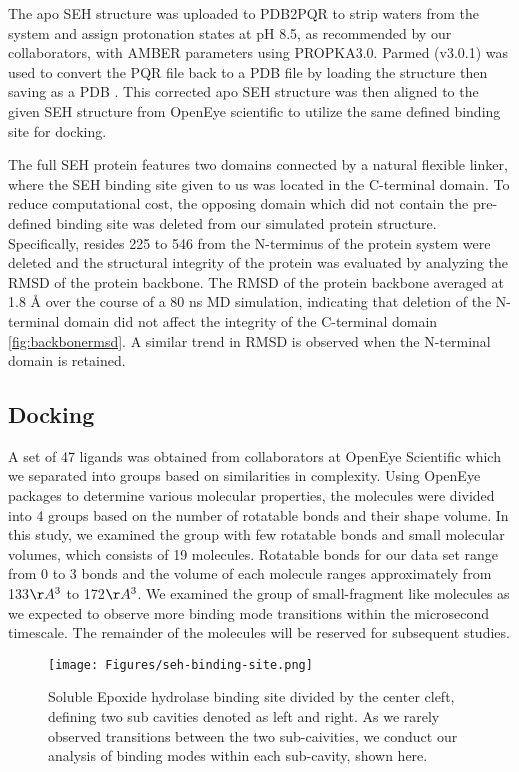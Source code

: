 \documentclass[journal=jcisd8,manuscript=article]{achemso}
\begin{document}
The apo SEH structure was uploaded to PDB2PQR \cite{} to strip waters from the system and assign protonation states at pH 8.5, as recommended by our collaborators, with AMBER parameters using PROPKA3.0\cite{jurrus_improvements_2018,sondergaard_improved_2011,noauthor_propka3:_nodate}. 
Parmed (v3.0.1) was used to convert the PQR file back to a PDB file by loading the structure then saving as a PDB \cite{swails_parameter/topology_2019}.
This corrected apo SEH structure was then aligned to the given SEH structure from OpenEye scientific to utilize the same defined binding site for docking.

The full SEH protein features two domains connected by a natural flexible linker, where the SEH binding site given to us was located in the C-terminal domain.
To reduce computational cost, the opposing domain which did not contain the pre-defined binding site was deleted from our simulated protein structure.
Specifically, resides 225 to 546 from the N-terminus of the protein system were deleted and the structural integrity of the protein was evaluated by analyzing the RMSD of the protein backbone.
The RMSD of the protein backbone averaged at 1.8 {\AA} over the course of a 80 ns MD simulation, indicating that deletion of the N-terminal domain did not affect the integrity of the C-terminal domain \ref{fig:backbonermsd}.
A similar trend in RMSD is observed when the N-terminal domain is retained.

\subsection{Docking}

A set of 47 ligands was obtained from collaborators at OpenEye Scientific which we separated into groups based on similarities in complexity. 
Using OpenEye packages to determine various molecular properties, the molecules were divided into 4 groups based on the number of rotatable bonds and their shape volume.
In this study, we examined the group with few rotatable bonds and small molecular volumes, which consists of 19 molecules.
Rotatable bonds for our data set range from 0 to 3 bonds and the volume of each molecule ranges approximately from 133\(\AA ^3\) to 172\(\AA ^3\).
We examined the group of small-fragment like molecules as we expected to observe more binding mode transitions within the microsecond timescale.
The remainder of the molecules will be reserved for subsequent studies.

\begin{figure}
    \centering
    \texttt{[image: Figures/seh-binding-site.png]}
    \caption{Soluble Epoxide hydrolase binding site divided by the center cleft, defining two sub cavities denoted as left and right. As we rarely observed transitions between the two sub-caivities, we conduct our analysis of binding modes within each sub-cavity, shown here. }
    \label{fig:sEH-ribbon}
\end{figure}
\end{document}
